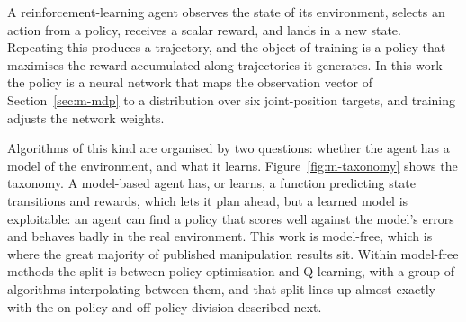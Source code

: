 A reinforcement-learning agent observes the state of its environment, selects an action from a
policy, receives a scalar reward, and lands in a new state. Repeating this produces a trajectory,
and the object of training is a policy that maximises the reward accumulated along trajectories it
generates. In this work the policy is a neural network that maps the observation vector of
Section~\ref{sec:m-mdp} to a distribution over six joint-position targets, and training adjusts the
network weights.

Algorithms of this kind are organised by two questions: whether the agent has a model of the
environment, and what it learns. Figure~\ref{fig:m-taxonomy} shows the taxonomy. A model-based
agent has, or learns, a function predicting state transitions and rewards, which lets it plan
ahead, but a learned model is exploitable: an agent can find a policy that scores well against the
model's errors and behaves badly in the real environment. This work is model-free, which is where
the great majority of published manipulation results sit. Within model-free methods the split is
between policy optimisation and Q-learning, with a group of algorithms interpolating between them,
and that split lines up almost exactly with the on-policy and off-policy division described next.

